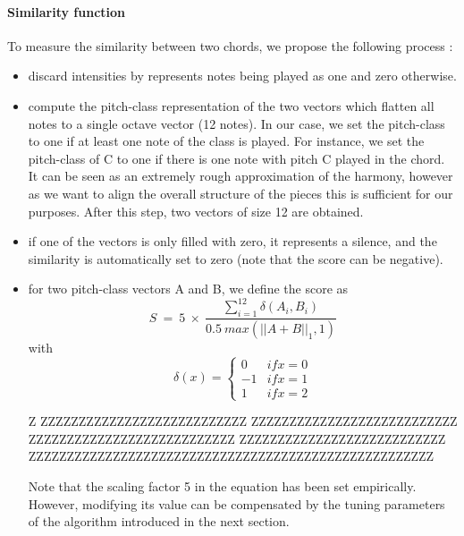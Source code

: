 \documentclass[twoside,twocolumn]{article}
\begin{document}
\paragraph{Similarity function}
To measure the similarity between two chords, we propose the following process :
\begin{itemize}
\item discard intensities by represents notes being played as one and zero otherwise.
\item compute the pitch-class representation of the two vectors which flatten all notes to a single octave vector (12 notes).
In our case, we set the pitch-class to one if at least one note of the class is played.
For instance, we set the pitch-class of C to one if there is one note with pitch C played in the chord.
It can be seen as an extremely rough approximation of the harmony, however as we want to align the overall structure of the pieces this is sufficient for our purposes.
After this step, two vectors of size 12 are obtained.
\item if one of the vectors is only filled with zero, it represents a silence, and the similarity is automatically set to zero (note that the score can be negative).
\item for two pitch-class vectors A and B, we define the score as 
\begin{equation}
S \ = \ 5 \ \times \ \frac{\sum_{i=1}^{12} \delta(A_i , B_i)}{0.5 \ max(||A+B||_1 , 1)}
\label{eq:score_function}
\end{equation}
with
\[\delta(x) =
    \begin{cases*}
      0 & if x = 0\\
      -1 & if x = 1\\
      1 & if x = 2
    \end{cases*} 
\]




Z
ZZZZZZZZZZZZZZZZZZZZZZZZZZZ
ZZZZZZZZZZZZZZZZZZZZZZZZZZZ
ZZZZZZZZZZZZZZZZZZZZZZZZZZZ
ZZZZZZZZZZZZZZZZZZZZZZZZZZZ
ZZZZZZZZZZZZZZZZZZZZZZZZZZZZZZZZZZZZZZZZZZZZZZZZZZZZZ

Note that the scaling factor 5 in the equation  has been set empirically. However, modifying its value can be compensated by the tuning parameters of the algorithm introduced in the next section.
\end{itemize}
\end{document}
